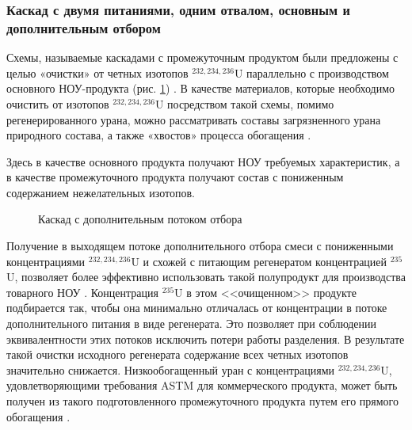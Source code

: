 \subsubsection{Каскад с двумя питаниями, одним отвалом, основным и дополнительным отбором}
Схемы, называемые каскадами с промежуточным продуктом были предложены с целью «очистки» от четных изотопов $^{232,234,236}$U параллельно с производством основного НОУ-продукта (рис. \ref{fig:3_out}) \cite{zhurinSPOSOBPERERABOTKIZAGRYaZNENNOGO, palkinAnaliticheskiyRaschetSoderzhaniya2007}. В качестве материалов, которые необходимо очистить от изотопов $^{232,234,236}$U посредством такой схемы, помимо регенерированного урана, можно рассматривать составы загрязненного урана природного состава, а также «хвостов» процесса обогащения \cite{palkinSeparationUraniumIsotopes2010}. 

Здесь в качестве основного продукта получают НОУ требуемых характеристик, а в качестве промежуточного продукта получают состав с пониженным содержанием нежелательных изотопов.
\begin{figure}[ht]
  \caption{Каскад с дополнительным потоком отбора}\label{fig:3_out}
\end{figure}

Получение в выходящем потоке дополнительного отбора смеси с пониженными концентрациями $^{232,234,236}$U и схожей с питающим регенератом концентрацией $^{235}$U, позволяет более эффективно использовать такой полупродукт для производства товарного НОУ \cite{palkinSeparationUraniumIsotopes2010}. Концентрация $^{235}$U в этом <<очищенном>> продукте подбирается так, чтобы она минимально отличалась от концентрации в потоке дополнительного питания в виде регенерата. Это позволяет при соблюдении эквивалентности этих потоков исключить потери работы разделения. В результате такой очистки исходного регенерата содержание всех четных изотопов значительно снижается. Низкообогащенный уран с концентрациями $^{232,234,236}$U, удовлетворяющими требования ASTM для коммерческого продукта, может быть получен из такого подготовленного промежуточного продукта путем его прямого обогащения \cite{shopenSposobPolucheniyaRazbavitelya2008}.


